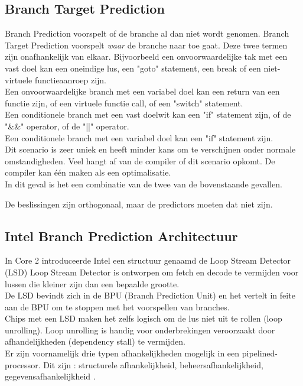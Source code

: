\subsection{Branch Target Prediction}
Branch Prediction voorspelt of de branche al dan niet wordt genomen.
Branch Target Prediction voorspelt \emph{waar} de branche naar toe gaat.
Deze twee termen zijn onafhankelijk van elkaar.
Bijvoorbeeld een onvoorwaardelijke tak met een vast doel kan een oneindige lus, een "goto" statement, een break of een niet-virtuele functieaanroep zijn.\\
Een onvoorwaardelijke branch met een variabel doel kan een return van een functie zijn, of een virtuele functie call, of een "switch" statement.\\
Een conditionele branch met een vast doelwit kan een "if" statement zijn, of de "\&\&" operator, of de "||" operator.\\
Een conditionele branch met een variabel doel kan een "if" statement zijn.\\
Dit scenario is zeer uniek en heeft minder kans om te verschijnen onder normale omstandigheden.
Veel hangt af van de compiler of dit scenario opkomt.
De compiler kan één maken als een optimalisatie.\\
In dit geval is het een combinatie van de twee van de bovenstaande gevallen.

De beslissingen zijn orthogonaal, maar de predictors moeten dat niet zijn.\\

\subsection{Intel Branch Prediction Architectuur}
In Core 2 introduceerde Intel een structuur genaamd de Loop Stream Detector (LSD)
Loop Stream Detector is ontworpen om fetch en decode te vermijden voor lussen die kleiner zijn dan een bepaalde grootte.\\
De LSD bevindt zich in de BPU (Branch Prediction Unit) en het vertelt in feite aan de BPU om te stoppen met het voorspellen van branches.\\

Chips met een LSD maken het zelfs logisch om de lus niet uit te rollen (loop unrolling).
Loop unrolling is handig voor onderbrekingen veroorzaakt door afhandelijkheden (dependency stall) te vermijden.\\

Er zijn voornamelijk drie typen afhankelijkheden mogelijk in een pipelined-processor. Dit zijn : structurele afhankelijkheid, beheersafhankelijkheid, gegevensafhankelijkheid \parencite{Hennessy2009}.

